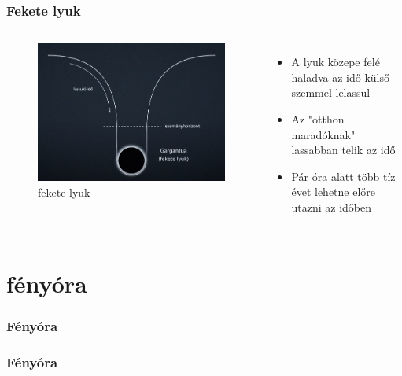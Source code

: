 \documentclass{beamer}
\begin{document}
\begin{frame}
\transdissolve
\frametitle{Fekete lyuk}
\begin{columns}
\begin{figure}
\caption{fekete lyuk}
\includegraphics[scale=0.2]{feketelyuk.png}
\end{figure}\pause
{}
\begin{itemize}
\item A lyuk közepe felé haladva az idő külső szemmel lelassul
\item Az "otthon maradóknak" lassabban telik az idő
\item Pár óra alatt több tíz évet lehetne előre utazni az időben
\end{itemize}
\end{columns}
\end{frame}


\section{fényóra}

\begin{frame}
\frametitle{Fényóra}
\end{frame}

\begin{frame}
\frametitle{Fényóra}
\end{frame}
\end{document}
